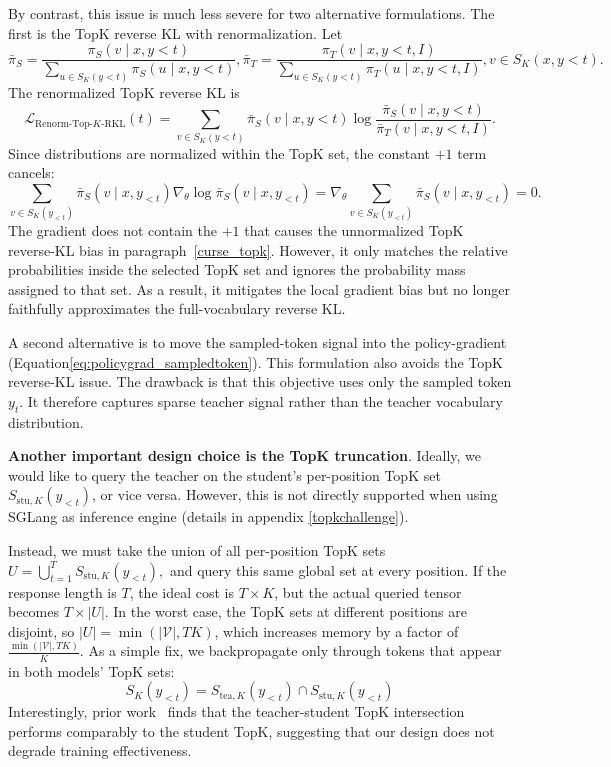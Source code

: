 By contrast, this issue is much less severe for two alternative formulations. The first is the TopK reverse KL with renormalization. Let
\begin{equation}
\bar \pi_S
=
\frac{\pi_S(v\mid x,y{<t})}
{\sum_{u\in S_K(y{<t})} \pi_S(u\mid x,y{<t})},
\bar \pi_T
=
\frac{\pi_T(v\mid x,y{<t},I)}
{\sum_{u\in S_K(y{<t})} \pi_T(u\mid x,y{<t},I)}, 
v\in S_K(x,y{<t}).
\end{equation}
The renormalized TopK reverse KL is
\begin{equation}
\mathcal L_{\mathrm{Renorm}\text{-}\mathrm{Top}\text{-}K\text{-}\mathrm{RKL}}(t)
=
\sum_{v\in S_K(y{<t})}
\bar\pi_S(v\mid x,y{<t})
\log
\frac{\bar\pi_S(v\mid x,y{<t})}
{\bar\pi_T(v\mid x,y{<t},I)} .
\label{eq:renormtopkKL}
\end{equation}
Since distributions are normalized within the TopK set, the
constant $+1$ term cancels:
\begin{equation}
\sum_{v\in S_K(y_{<t})}
\bar\pi_S(v\mid x,y_{<t})
\nabla_\theta \log \bar\pi_S(v\mid x,y_{<t})
=
\nabla_\theta
\sum_{v\in S_K(y_{<t})}
\bar\pi_S(v\mid x,y_{<t})
=0.
\end{equation}
The gradient does not contain the $+1$ that causes the
unnormalized TopK reverse-KL bias in paragraph~\ref{curse_topk}. However, it only matches the relative probabilities
inside the selected TopK set and ignores the probability mass assigned
to that set. As a result, it mitigates the local gradient bias but no longer
faithfully approximates the full-vocabulary reverse KL.


A second alternative is to move the sampled-token signal into the policy-gradient (Equation\ref{eq:policygrad_sampledtoken}). This formulation also avoids the TopK reverse-KL issue. The drawback is that this objective uses only the sampled token \(y_t\). It therefore captures sparse teacher signal rather than the teacher vocabulary distribution.


\textbf{Another important design choice is the TopK truncation}. Ideally, we would like to query the teacher on the student's per-position TopK set $S_{\mathrm{stu},K}(y_{<t})$, or vice versa. 
However, this is not directly supported when using SGLang as inference engine (details in appendix \ref{topkchallenge}). 

Instead, we must take the union of all per-position TopK sets
$
U=\bigcup_{t=1}^T S_{\mathrm{stu},K}(y_{<t}),
$
and query this same global set at every position. If the response length is $T$, the ideal cost is $T\times K$, but the actual queried tensor becomes $T\times |U|$. 
In the worst case, the TopK sets at different positions are disjoint, so
$|U|=\min(|\mathcal V|,TK)$,
which increases memory by a factor of $\frac{\min(|\mathcal V|,TK)}{K}$. As a simple fix, we backpropagate only through tokens that appear in both models' TopK sets:
\begin{equation}
S_{K}(y_{<t}) = S_{\mathrm{tea},K}(y_{<t})\cap S_{\mathrm{stu},K}(y_{<t}) 
\end{equation}
Interestingly, prior work~\cite{li2026rethinkingonpolicydistillationlarge} finds that the teacher-student TopK intersection performs comparably to the student TopK, suggesting that our design does not degrade training effectiveness.



